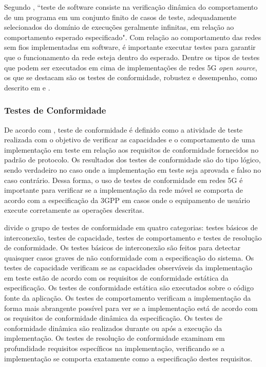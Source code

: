 Segundo \cite[p.~2, tradução nossa]{Bertolino2003}, ``teste de software consiste na verificação dinâmica do comportamento de um programa em um conjunto finito de casos de teste, adequadamente selecionados do domínio de execuções geralmente infinitas, em relação ao comportamento esperado especificado".
Com relação ao comportamento das redes sem fios implementadas em software, é importante executar testes para garantir que o funcionamento da rede esteja dentro do esperado.
Dentre os tipos de testes que podem ser executados em cima de implementações de redes 5G \textit{open source}, os que se destacam são os testes de conformidade, robustez e desempenho, como descrito em \cite{Dominato2021} e \cite{Zhang2019ASO}.

\subsubsection{Testes de Conformidade}

De acordo com \cite{Sarikaya1989}, teste de conformidade é definido como a atividade de teste realizada com o objetivo de verificar as capacidades e o comportamento de uma implementação em teste em relação aos requisitos de conformidade fornecidos no padrão de protocolo.
Os resultados dos testes de conformidade são do tipo lógico, sendo verdadeiro no caso onde a implementação em teste seja aprovada e falso no caso contrário.
Dessa forma, o uso de testes de conformidade em redes 5G é importante para verificar se a implementação da rede móvel se comporta de acordo com a especificação da 3GPP em casos onde o equipamento de usuário execute corretamente as operações descritas.

\cite{Rayner1987} divide o grupo de testes de conformidade em quatro categorias: testes básicos de interconexão, testes de capacidade, testes de comportamento e testes de resolução de conformidade.
Os testes básicos de interconexão são feitos para detectar quaisquer casos graves de não conformidade com a especificação do sistema.
Os testes de capacidade verificam se as capacidades observáveis da implementação em teste estão de acordo com os requisitos de conformidade estática da especificação. Os testes de conformidade estática são executados sobre o código fonte da aplicação.
Os testes de comportamento verificam a implementação da forma mais abrangente possível para ver se a implementação está de acordo com os requisitos de conformidade dinâmica da especificação. Os testes de conformidade dinâmica são realizados durante ou após a execução da implementação.
Os testes de resolução de conformidade examinam em profundidade requisitos específicos na implementação, verificando se a implementação se comporta exatamente como a especificação destes requisitos.

